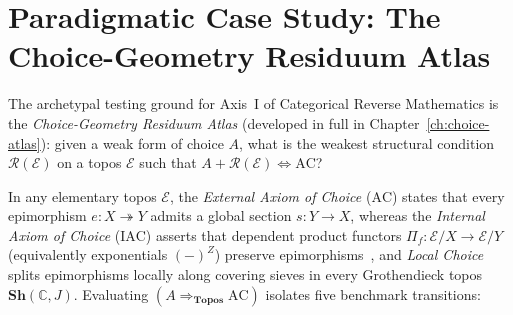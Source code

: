 \documentclass[10pt,twoside,openright]{book}
\theoremstyle{crmplain}
\theoremstyle{crmdef}
\theoremstyle{crmremark}
\begin{document}
\section{Paradigmatic Case Study: The Choice-Geometry Residuum Atlas}

The archetypal testing ground for Axis~I of Categorical Reverse Mathematics is the \emph{Choice-Geometry Residuum Atlas} (developed in full in Chapter~\ref{ch:choice-atlas}): given a weak form of choice $A$, what is the weakest structural condition $\mathcal{R}(\mathcal{E})$ on a topos $\mathcal{E}$ such that $A + \mathcal{R}(\mathcal{E}) \iff \mathrm{AC}$?

In any elementary topos $\mathcal{E}$, the \emph{External Axiom of Choice} ($\mathrm{AC}$) states that every epimorphism $e: X \twoheadrightarrow Y$ admits a global section $s: Y \to X$, whereas the \emph{Internal Axiom of Choice} ($\mathrm{IAC}$) asserts that dependent product functors $\Pi_f : \mathcal{E}/X \to \mathcal{E}/Y$ (equivalently exponentials $(-)^Z$) preserve epimorphisms~\cite{Johnstone02}, and \emph{Local Choice} splits epimorphisms locally along covering sieves in every Grothendieck topos $\mathbf{Sh}(\mathbb{C}, J)$. Evaluating $(A \Rightarrow_{\mathbf{Topos}} \mathrm{AC})$ isolates five benchmark transitions:
\end{document}
